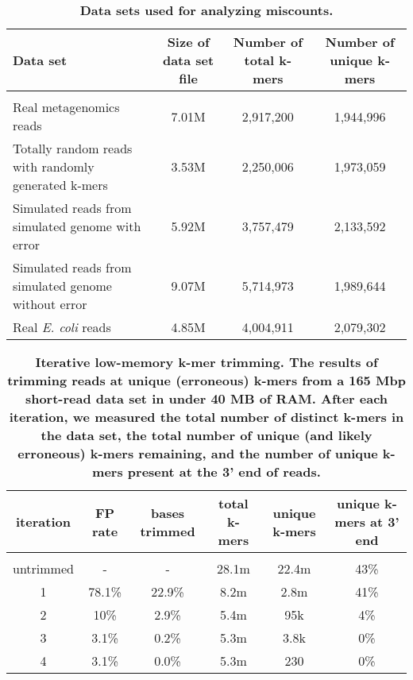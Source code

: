 \documentclass[10pt]{article}
\begin{document}
\begin{table}[!ht]
\caption{
\bf{Data sets used for analyzing miscounts.}}
\begin{tabular}{ | p{5cm} | c | c | c |}
Data set & Size of data set file & Number of total k-mers & Number of unique k-mers \\
\hline \\
Real metagenomics reads                                  & 7.01M  & 2,917,200  & 1,944,996 \\
\hline
Totally random reads with randomly generated k-mers      & 3.53M  & 2,250,006  & 1,973,059 \\
\hline
Simulated reads from simulated genome with error         & 5.92M  & 3,757,479  & 2,133,592 \\
\hline
Simulated reads from simulated genome without error      & 9.07M  & 5,714,973  & 1,989,644 \\
\hline
Real {\em E. coli} reads                                        & 4.85M  & 4,004,911  & 2,079,302 \\
\end{tabular}
\begin{flushleft}
\end{flushleft}
\label{table:random_data}
\end{table}




\begin{table}[!ht]
\caption{
\bf{Iterative low-memory k-mer trimming.  The results of trimming
  reads at unique (erroneous) k-mers from a 165 Mbp short-read data
  set in under 40 MB of RAM.  After each iteration, we measured the
  total number of distinct k-mers in the data set, the total number
  of unique (and likely erroneous) k-mers remaining, and the
  number of unique k-mers present at the 3' end of reads.}}
\begin{tabular}{ | c | c | c | c | c | c |}
iteration & FP rate & bases trimmed & total k-mers & unique k-mers & 
unique k-mers at 3' end \\
\hline \\
untrimmed  &      -  &      - & 28.1m & 22.4m & 43\% \\
1          & 78.1\%  & 22.9\% &  8.2m &  2.8m & 41\% \\
2          &   10\%  &  2.9\% &  5.4m &   95k &  4\% \\
3          &  3.1\%  &  0.2\% &  5.3m &  3.8k &  0\% \\
4          &  3.1\%  &  0.0\% &  5.3m &   230 &  0\% \\
\end{tabular}
\begin{flushleft}
\end{flushleft}
\label{table:loop_trim}
\end{table}
\end{document}
